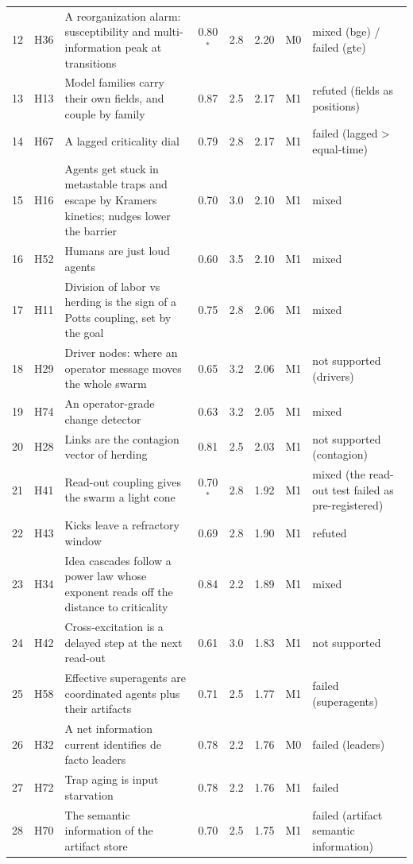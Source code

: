 \begin{table}[p]
\begin{tabular}{@{}r l p{} c c c c l@{}}
12 & H36 & A reorganization alarm: susceptibility and multi-information peak at transitions & 0.80$^\ast$ & 2.8 & 2.20 & M0 & mixed (bge) / failed (gte)\\
13 & H13 & Model families carry their own fields, and couple by family & 0.87 & 2.5 & 2.17 & M1 & refuted (fields as positions)\\
14 & H67 & A lagged criticality dial & 0.79 & 2.8 & 2.17 & M1 & failed (lagged > equal-time)\\
15 & H16 & Agents get stuck in metastable traps and escape by Kramers kinetics; nudges lower the barrier & 0.70 & 3.0 & 2.10 & M1 & mixed\\
16 & H52 & Humans are just loud agents & 0.60 & 3.5 & 2.10 & M1 & mixed\\
17 & H11 & Division of labor vs herding is the sign of a Potts coupling, set by the goal & 0.75 & 2.8 & 2.06 & M1 & mixed\\
18 & H29 & Driver nodes: where an operator message moves the whole swarm & 0.65 & 3.2 & 2.06 & M1 & not supported (drivers)\\
19 & H74 & An operator-grade change detector & 0.63 & 3.2 & 2.05 & M1 & mixed\\
20 & H28 & Links are the contagion vector of herding & 0.81 & 2.5 & 2.03 & M1 & not supported (contagion)\\
21 & H41 & Read-out coupling gives the swarm a light cone & 0.70$^\ast$ & 2.8 & 1.92 & M1 & mixed (the read-out test failed as pre-registered)\\
22 & H43 & Kicks leave a refractory window & 0.69 & 2.8 & 1.90 & M1 & refuted\\
23 & H34 & Idea cascades follow a power law whose exponent reads off the distance to criticality & 0.84 & 2.2 & 1.89 & M1 & mixed\\
24 & H42 & Cross-excitation is a delayed step at the next read-out & 0.61 & 3.0 & 1.83 & M1 & not supported\\
25 & H58 & Effective superagents are coordinated agents plus their artifacts & 0.71 & 2.5 & 1.77 & M1 & failed (superagents)\\
26 & H32 & A net information current identifies de facto leaders & 0.78 & 2.2 & 1.76 & M0 & failed (leaders)\\
27 & H72 & Trap aging is input starvation & 0.78 & 2.2 & 1.76 & M1 & failed\\
28 & H70 & The semantic information of the artifact store & 0.70 & 2.5 & 1.75 & M1 & failed (artifact semantic information)\\

\end{tabular}
\end{table}
